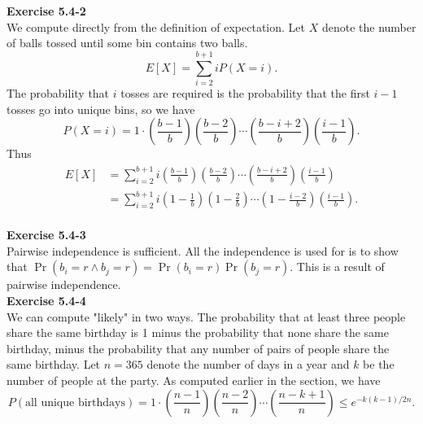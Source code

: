 \documentclass{article}
\begin{document}
\noindent\textbf{Exercise 5.4-2}\\

We compute directly from the definition of expectation. Let $X$ denote the number of balls tossed until some bin contains two balls. 
\[E[X] = \sum_{i=2}^{b+1}iP(X=i).\]
The probability that $i$ tosses are required is the probability that the first $i-1$ tosses go into unique bins, so we have
\[ P(X=i) = 1\cdot \left(\frac{b-1}{b}\right)\left(\frac{b-2}{b}\right) \cdots \left(\frac{b-i+2}{b}\right)\left(\frac{i-1}{b}\right).\]
Thus
\begin{align*}
 E[X] &=  \sum_{i=2}^{b+1}i\left(\frac{b-1}{b}\right)\left(\frac{b-2}{b}\right) \cdots \left(\frac{b-i+2}{b}\right)\left(\frac{i-1}{b}\right) \\
&=\sum_{i=2}^{b+1}i\left(1-\frac{1}{b}\right)\left(1-\frac{2}{b}\right) \cdots \left(1-\frac{i-2}{b}\right)\left(\frac{i-1}{b}\right). \\
\end{align*}

\noindent\textbf{Exercise 5.4-3}\\

Pairwise independence is sufficient. All the independence is used for is to show that $\Pr(b_i=r \wedge b_j=r) = \Pr(b_i=r)\Pr(b_j=r)$. This is a result of pairwise independence.\\

\noindent\textbf{Exercise 5.4-4}\\

We can compute "likely" in two ways.  The probability that at least three people share the same birthday is 1 minus the probability that none share the same birthday, minus the probability that any number of pairs of people share the same birthday.  Let $n=365$ denote the number of days in a year and $k$ be the number of people at the party.  As computed earlier in the section, we have
\[ P(\mbox{all unique birthdays}) = 1 \cdot \left(\frac{n-1}{n}\right)\left(\frac{n-2}{n}\right)\cdots \left(\frac{n-k+1}{n}\right) \leq e^{-k(k-1)/2n}.\]
\end{document}

